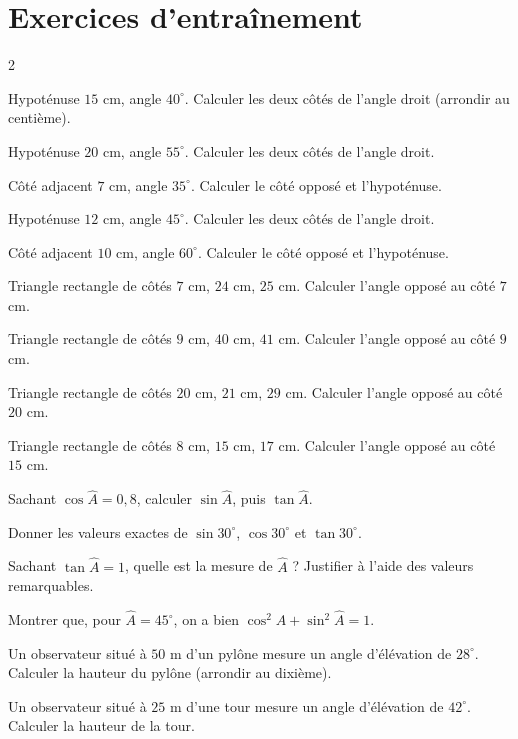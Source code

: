 \section{Exercices d'entraînement}
\begin{multicols}{2}

\exo{} Hypoténuse $15$ cm, angle $40^{\circ}$. Calculer les deux côtés de l'angle
droit (arrondir au centième).

\exo{} Hypoténuse $20$ cm, angle $55^{\circ}$. Calculer les deux côtés de l'angle
droit.

\exo{} Côté adjacent $7$ cm, angle $35^{\circ}$. Calculer le côté opposé et
l'hypoténuse.

\exo{} Hypoténuse $12$ cm, angle $45^{\circ}$. Calculer les deux côtés de l'angle
droit.

\exo{} Côté adjacent $10$ cm, angle $60^{\circ}$. Calculer le côté opposé et
l'hypoténuse.

\exo{} Triangle rectangle de côtés $7$ cm, $24$ cm, $25$ cm. Calculer l'angle
opposé au côté $7$ cm.

\exo{} Triangle rectangle de côtés $9$ cm, $40$ cm, $41$ cm. Calculer l'angle
opposé au côté $9$ cm.

\exo{} Triangle rectangle de côtés $20$ cm, $21$ cm, $29$ cm. Calculer l'angle
opposé au côté $20$ cm.

\exo{} Triangle rectangle de côtés $8$ cm, $15$ cm, $17$ cm. Calculer l'angle
opposé au côté $15$ cm.

\exo{} Sachant $\cos\widehat A=0{,}8$, calculer $\sin\widehat A$, puis
$\tan\widehat A$.

\exo{} Donner les valeurs exactes de $\sin30^{\circ}$, $\cos30^{\circ}$ et
$\tan30^{\circ}$.

\exo{} Sachant $\tan\widehat A=1$, quelle est la mesure de $\widehat A$ ? Justifier
à l'aide des valeurs remarquables.

\exo{} Montrer que, pour $\widehat A=45^{\circ}$, on a bien
$\cos^{2}\widehat A+\sin^{2}\widehat A=1$.

\exo{} Un observateur situé à $50$ m d'un pylône mesure un angle d'élévation de
$28^{\circ}$. Calculer la hauteur du pylône (arrondir au dixième).

\exo{} Un observateur situé à $25$ m d'une tour mesure un angle d'élévation de
$42^{\circ}$. Calculer la hauteur de la tour.


\end{multicols}
